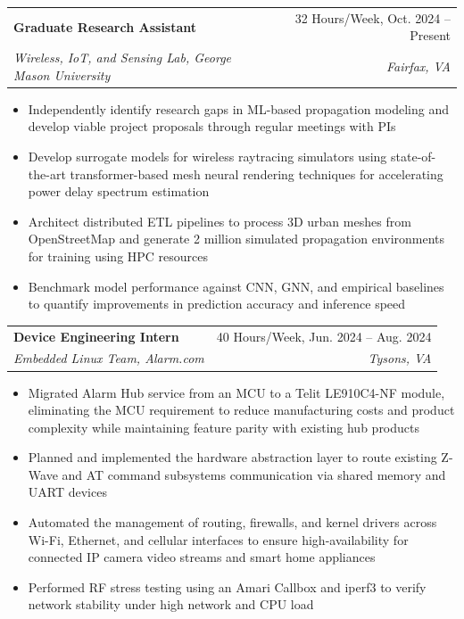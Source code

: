 \documentclass[letterpaper,11pt]{article}
\makeatletter
\newcommand{\resumeItem}[1]{
  \item\small{
    {#1 \vspace{-2pt}}
  }
}
\newcommand{\resumeSubheading}[4]{
  \vspace{-2pt}\item
    \begin{tabular*}{0.97\textwidth}[t]{l@{\extracolsep{\fill}}r}
      \textbf{#1} & #2 \\
      \textit{\small#3} & \textit{\small #4} \\
    \end{tabular*}\vspace{-7pt}
}
\newcommand{\resumeItemListStart}{\begin{itemize}}
\newcommand{\resumeItemListEnd}{\end{itemize}\vspace{-5pt}}
\makeatother
\begin{document}
    \resumeSubheading
      {Graduate Research Assistant}{32 Hours/Week, Oct. 2024 -- Present}
      {Wireless, IoT, and Sensing Lab, George Mason University}{Fairfax, VA}
      \resumeItemListStart
        \resumeItem{Independently identify research gaps in ML-based propagation modeling and develop viable project proposals through regular meetings with PIs}
        \resumeItem{Develop surrogate models for wireless raytracing simulators using state-of-the-art transformer-based mesh neural rendering techniques for accelerating power delay spectrum estimation}
        \resumeItem{Architect distributed ETL pipelines to process 3D urban meshes from OpenStreetMap and generate 2 million simulated propagation environments for training using HPC resources}
        \resumeItem{Benchmark model performance against CNN, GNN, and empirical baselines to quantify improvements in prediction accuracy and inference speed}
      \resumeItemListEnd

    \resumeSubheading
      {Device Engineering Intern}{40 Hours/Week, Jun. 2024 -- Aug. 2024}
      {Embedded Linux Team, Alarm.com}{Tysons, VA}
      \resumeItemListStart
        \resumeItem{Migrated Alarm Hub service from an MCU to a Telit LE910C4-NF module, eliminating the MCU requirement to reduce manufacturing costs and product complexity while maintaining feature parity with existing hub products}
        \resumeItem{Planned and implemented the hardware abstraction layer to route existing Z-Wave and AT command subsystems communication via shared memory and UART devices}
        \resumeItem{Automated the management of routing, firewalls, and kernel drivers across Wi-Fi, Ethernet, and cellular interfaces to ensure high-availability for connected IP camera video streams and smart home appliances}
        \resumeItem{Performed RF stress testing using an Amari Callbox and iperf3 to verify network stability under high network and CPU load}
      \resumeItemListEnd
\end{document}
